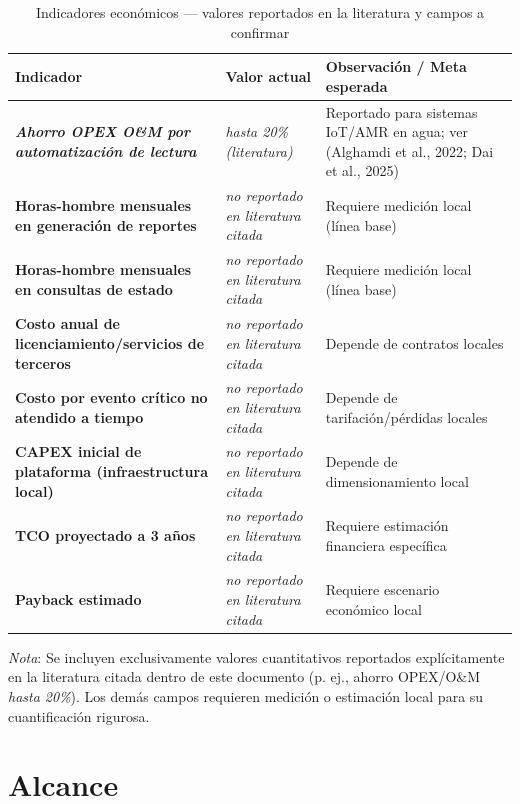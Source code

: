 \documentclass[12pt,a4paper,oneside]{report}
\begin{document}
\begin{table}[H]
\caption{Indicadores económicos — valores reportados en la literatura y campos a confirmar}
\label{tab:dimension-economica}
\centering
\begin{tabularx}{\textwidth}{>{\bfseries}l p{3.2cm} X}
\toprule
Indicador & Valor actual & Observación / Meta esperada \\
\midrule
\textit{Ahorro OPEX O\&M por automatización de lectura} & \textit{hasta 20\% (literatura)} & Reportado para sistemas IoT/AMR en agua; ver (Alghamdi et al., 2022; Dai et al., 2025) \\
Horas-hombre mensuales en generación de reportes & \textit{no reportado en literatura citada} & Requiere medición local (línea base) \\
Horas-hombre mensuales en consultas de estado & \textit{no reportado en literatura citada} & Requiere medición local (línea base) \\
Costo anual de licenciamiento/servicios de terceros & \textit{no reportado en literatura citada} & Depende de contratos locales \\
Costo por evento crítico no atendido a tiempo & \textit{no reportado en literatura citada} & Depende de tarifación/pérdidas locales \\
CAPEX inicial de plataforma (infraestructura local) & \textit{no reportado en literatura citada} & Depende de dimensionamiento local \\
TCO proyectado a 3 años & \textit{no reportado en literatura citada} & Requiere estimación financiera específica \\
Payback estimado & \textit{no reportado en literatura citada} & Requiere escenario económico local \\
\bottomrule
\end{tabularx}
\end{table}

\noindent\footnotesize\textit{Nota}: Se incluyen exclusivamente valores cuantitativos reportados explícitamente en la literatura citada dentro de este documento (p. ej., ahorro OPEX/O\&M \textit{hasta 20\%}). Los demás campos requieren medición o estimación local para su cuantificación rigurosa.

\section{Alcance}\label{alcance}
\end{document}
